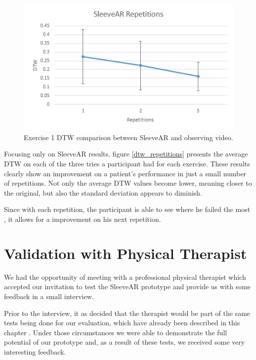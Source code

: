 \begin{figure}[t!]
    \centering
    \includegraphics{imgs/results/dtw_repetitions.png}
    \caption{Exercise 1 DTW comparison between SleeveAR and observing video.}
    \label{fig:dtw_repetitions}
\end{figure}

Focusing only on SleeveAR results, figure \ref{dtw_repetitions} presents the average DTW on each of the three tries a participant had for each exercise. 
These results clearly show an improvement on a patient's performance in just a small number of repetitions. 
Not only the average DTW values become lower, meaning closer to the original, but also the standard deviation appears to diminish. 

Since with each repetition, the participant is able to see where he failed the most , 
it allows for a improvement on his next repetition.


\section{Validation with Physical Therapist}

We had the opportunity of meeting with a professional physical therapist which accepted our invitation to test the SleeveAR prototype and provide us with some feedback in a small interview.

Prior to the interview, it as decided that the therapist would be part of the same tests being done for our evaluation, which have already been described in this chapter . Under those circumstances we were able to demonstrate the full potential of our prototype and, as a result of these tests, we received some very interesting feedback.

